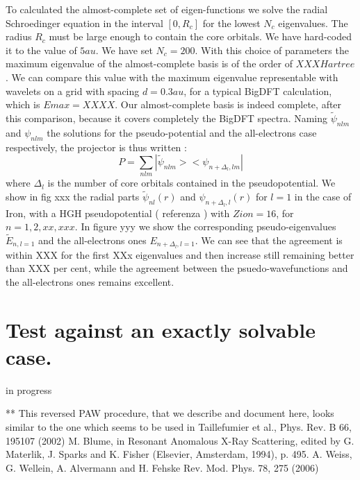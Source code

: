 \documentclass[a4paper,11pt]{report}
\begin{document}
To calculated the almost-complete set of eigen-functions
we solve the radial Schroedinger equation in the interval $[0,R_c]$
for the lowest $N_c$ eigenvalues. The radius $R_c$ must be large
enough to contain the core orbitals. We have hard-coded it to the
value of $5au$. We have set $N_c=200$. With this choice of parameters
the maximum eigenvalue of the almost-complete basis is of the order
of $XXX Hartree$. We can compare this value with the maximum
eigenvalue representable with wavelets on a grid with spacing
$d=0.3au$, for a typical BigDFT calculation,  which is $Emax = XXXX$.
Our almost-complete basis is indeed
complete, after this comparison, because 
it covers completely the BigDFT spectra. 
Naming   $\tilde \psi_{nlm}$ and $\psi_{nlm}$ 
the solutions for the pseudo-potential and the all-electrons case
respectively, 
the projector is thus written :
$$   P= \sum_{nlm} |\tilde \psi_{nlm}><\psi_{n+\Delta_l,lm}| $$
where $\Delta_l$ is the number of core orbitals contained in the
pseudopotential.
We show in fig xxx the radial parts 
 $\tilde \psi_{nl}(r)$ and $\psi_{n+\Delta_l,l}(r)$  for $l=1$
 in the case of Iron, with a HGH pseudopotential  ( referenza )
with $Zion=16$, for $n=1,2,xx,xxx$.
In figure yyy we show the corresponding  pseudo-eigenvalues $\tilde E_{n,l=1}$ and
the all-electrons ones $ E_{n+\Delta_l,l=1}$.
We can see that the agreement is within XXX for the first XXx
eigenvalues and then increase still remaining better than XXX per cent,
while the agreement between the psuedo-wavefunctions and the
all-electrons ones remains excellent. 


\section{Test against an exactly solvable case.}
 
in progress


  
 \begin{thebibliography}{0}
** This reversed PAW procedure, that we describe and document here, looks similar to the one which seems to be  used in Taillefumier et al., Phys. Rev. B 66, 195107 (2002) 
   M. Blume, in Resonant Anomalous X-Ray Scattering, edited by G. Materlik, J. Sparks and K. Fisher (Elsevier, Amsterdam, 1994), p. 495.
 A. Weiss, G. Wellein, A. Alvermann and H. Fehske Rev. Mod. Phys. 78, 275 (2006) 


 \end{thebibliography}
\end{document}
